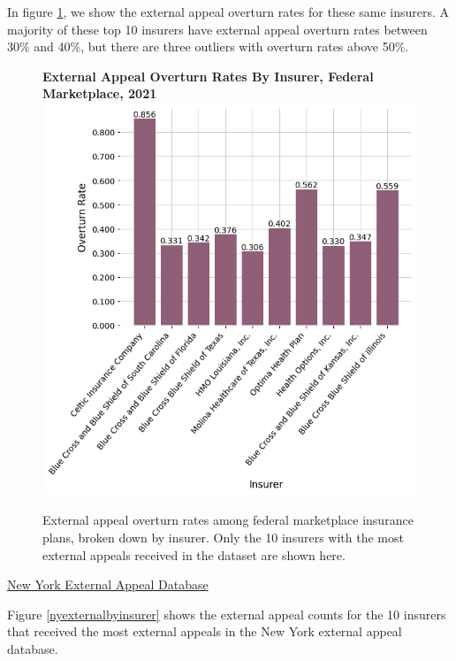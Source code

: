 \documentclass[12pt, a4paper,twoside]{report}
\theoremstyle{plain} %
\theoremstyle{definition} %
\theoremstyle{remark} %
\numberwithin{equation}{chapter}
\begin{document}
		In figure \ref{federalexternaloverturnsbyinsurer}, we show the external appeal overturn rates for these same insurers. A majority of these top 10 insurers have external appeal overturn rates between 30\% and 40\%, but there are three outliers with overturn rates above 50\%.
		
		
		\begin{figure}[h!]
			\centering
			\textbf{External Appeal Overturn Rates By Insurer, Federal Marketplace, 2021}
			\includegraphics[width=.8\textwidth]{images/cms_puf/overturn_rates_by_insurer.png}
			\caption{External appeal overturn rates among federal marketplace insurance plans, broken down by insurer. Only the 10 insurers with the most external appeals received in the dataset are shown here.}
			\label{federalexternaloverturnsbyinsurer}
		\end{figure}
	
	
		\underline{New York External Appeal Database}

		Figure \ref{nyexternalbyinsurer} shows the external appeal counts for the 10 insurers that received the most external appeals in the New York external appeal database.
		
\end{document}
